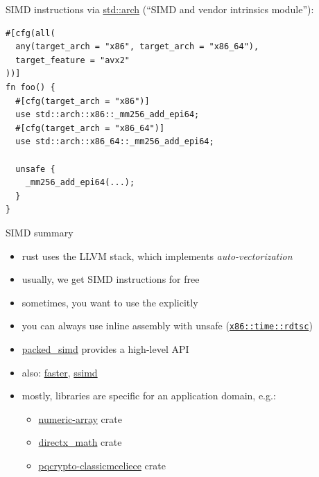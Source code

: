 \documentclass{beamer}
\begin{document}
\begin{frame}[fragile]{SIMD instructions}
  via \href{https://doc.rust-lang.org/1.29.0/std/arch/}{std::arch} (\enquote{SIMD and vendor intrinsics module}):

  \begin{verbatim}
#[cfg(all(
  any(target_arch = "x86", target_arch = "x86_64"),
  target_feature = "avx2"
))]
fn foo() {
  #[cfg(target_arch = "x86")]
  use std::arch::x86::_mm256_add_epi64;
  #[cfg(target_arch = "x86_64")]
  use std::arch::x86_64::_mm256_add_epi64;

  unsafe {
    _mm256_add_epi64(...);
  }
}
  \end{verbatim}
\end{frame}

\begin{frame}[fragile]{SIMD summary}
  \begin{itemize}
    \item rust uses the LLVM stack, which implements \emph{auto-vectorization}
    \item usually, we get SIMD instructions for free
    \item sometimes, you want to use the explicitly
    \item you can always use inline assembly with unsafe (\texttt{\href{https://docs.rs/x86/0.29.0/x86/time/fn.rdtsc.html}{x86::time::rdtsc}})
    \item \href{https://github.com/rust-lang/packed_simd}{packed\_simd} provides a high-level API
    \item also: \href{https://crates.io/crates/faster}{faster}, \href{https://crates.io/crates/ssimd}{ssimd}
    \item mostly, libraries are specific for an application domain, e.g.:
    \begin{itemize}
      \item \href{https://github.com/novacrazy/numeric-array}{numeric-array} crate
      \item \href{https://crates.io/crates/directx_math}{directx\_math} crate
      \item \href{https://crates.io/crates/pqcrypto-classicmceliece}{pqcrypto-classicmceliece} crate
    \end{itemize}
  \end{itemize}
\end{frame}

\end{document}
